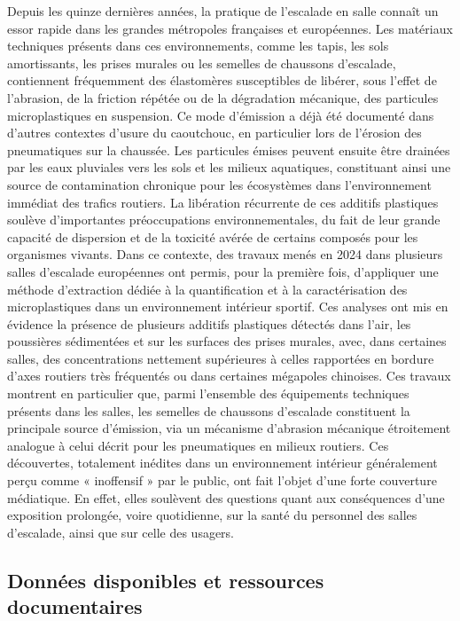 \documentclass[pdflatex,sn-basic]{sn-jnl}%
\begin{document}
Depuis les quinze dernières années, la pratique de l'escalade en salle connaît un essor rapide dans les grandes métropoles françaises et européennes. Les matériaux techniques présents dans ces environnements, comme les tapis, les sols amortissants, les prises murales ou les semelles de chaussons d'escalade, contiennent fréquemment des élastomères susceptibles de libérer, sous l'effet de l'abrasion, de la friction répétée ou de la dégradation mécanique, des
particules microplastiques en suspension. Ce mode d'émission a déjà été documenté dans d'autres contextes d'usure du caoutchouc, en particulier lors de l'érosion des pneumatiques sur la chaussée. Les particules émises peuvent ensuite être drainées par les eaux pluviales vers les sols et les milieux aquatiques, constituant ainsi une source de contamination chronique pour les écosystèmes dans l'environnement immédiat des trafics routiers. La libération récurrente de ces additifs plastiques soulève d'importantes préoccupations environnementales, du fait de leur grande capacité de dispersion et de la toxicité avérée de certains composés pour les organismes vivants. Dans ce contexte, des travaux menés en 2024 dans plusieurs salles d'escalade européennes ont permis, pour la première fois, d'appliquer une méthode d'extraction dédiée à la quantification et à la caractérisation des microplastiques dans un environnement intérieur sportif. Ces analyses ont mis en évidence la présence de plusieurs additifs plastiques détectés dans l'air, les poussières sédimentées et sur les surfaces des prises murales, avec, dans certaines salles, des
concentrations nettement supérieures à celles rapportées en bordure d'axes routiers très fréquentés ou dans certaines mégapoles chinoises. Ces travaux montrent en particulier que, parmi l'ensemble des équipements techniques présents dans les salles, les semelles de chaussons d'escalade constituent la principale source d'émission, via un mécanisme d'abrasion mécanique étroitement analogue à celui décrit pour les pneumatiques en milieux routiers. Ces découvertes, totalement inédites dans un environnement intérieur généralement perçu comme «
inoffensif » par le public, ont fait l'objet d'une forte couverture médiatique. En effet, elles soulèvent des questions quant aux conséquences d'une exposition prolongée, voire quotidienne, sur la santé du personnel des salles d'escalade, ainsi que sur celle des usagers.

\subsection{Données disponibles et ressources documentaires}\label{subsec3}
\end{document}
